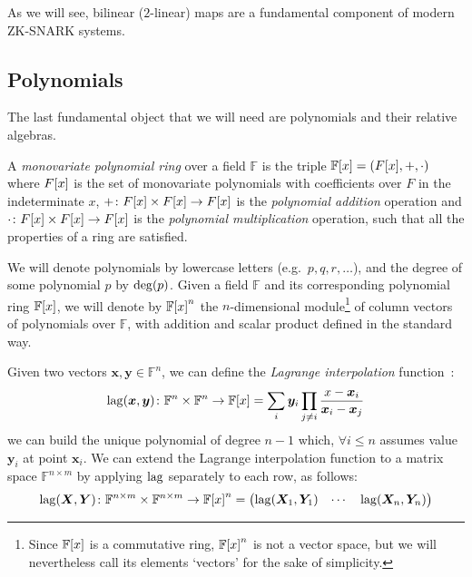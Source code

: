 As we will see, bilinear (\(2\)-linear) maps are a fundamental component of modern ZK-SNARK systems.

\subsection{Polynomials}
The last fundamental object that we will need are polynomials and their relative algebras. 
\begin{definition}
  A \emph{monovariate polynomial ring} over a field \(\mathbb{F}\) is the triple 
  \(\extend{\mathbb{F}}{x} = \Tuple{\extend{F}{x}, +, \cdot}\) where \(\extend{F}{x}\) is the set 
  of monovariate polynomials with coefficients over \(F\) in the indeterminate \(x\), 
  \(+\colon \extend{F}{x} \times \extend{F}{x} \to \extend{F}{x}\) is the \emph{polynomial addition}
  operation and \(\cdot\colon \extend{F}{x} \times \extend{F}{x} \to \extend{F}{x}\) is the
  \emph{polynomial multiplication} operation, such that all the properties of a ring are satisfied.
\end{definition}

We will denote polynomials by lowercase letters (e.g.\  \(p, q, r, \dots \)), and the degree of 
some polynomial \(p\) by \(\call{\deg}{p}\).
Given a field \(\mathbb{F}\) and its corresponding polynomial ring \(\extend{\mathbb{F}}{x}\), 
we will denote by \(\extend{\mathbb{F}}{x}^n\) the \(n\)-dimensional module\footnote{Since 
\(\extend{\mathbb{F}}{x}\) is a commutative ring, \(\extend{\mathbb{F}}{x}^n\) is not a vector 
space, but we will nevertheless call its elements `vectors' for the sake of simplicity.} of 
column vectors of polynomials over \(\mathbb{F}\), with addition and scalar product defined in the 
standard way.

Given two vectors \(\bm{x}, \bm{y} \in \mathbb{F}^n\), we can define the
\emph{Lagrange interpolation} function~\cite{Waring1779}:
\[
  \call{\lagrange}{\bm{x}, \bm{y}}\colon \mathbb{F}^n \times \mathbb{F}^n \to \extend{\mathbb{F}}{x} = 
  \sum_{i}{\bm{y}_i\prod_{j \neq i}{\frac{x - \bm{x}_i}{\bm{x}_i - \bm{x}_j}}}
\]
we can build the unique polynomial of degree \(n - 1\) which, \(\forall i \le n\) assumes 
value \(\bm{y}_i\) at point \(\bm{x}_i\).
We can extend the Lagrange interpolation function to a matrix space \(\mathbb{F}^{n \times m}\)
by applying \(\mathrm{lag} \) separately to each row, as follows:
\[
  \call{\lagrange}{\bm{X}, \bm{Y}}\colon \mathbb{F}^{n \times m} \times \mathbb{F}^{n \times m} \to 
  \extend{\mathbb{F}}{x}^n = 
  \begin{pmatrix*} 
    \call{\lagrange}{\bm{X}_1, \bm{Y}_1} & \cdots & \call{\lagrange}{\bm{X}_n, \bm{Y}_n}
  \end{pmatrix*}
\]
